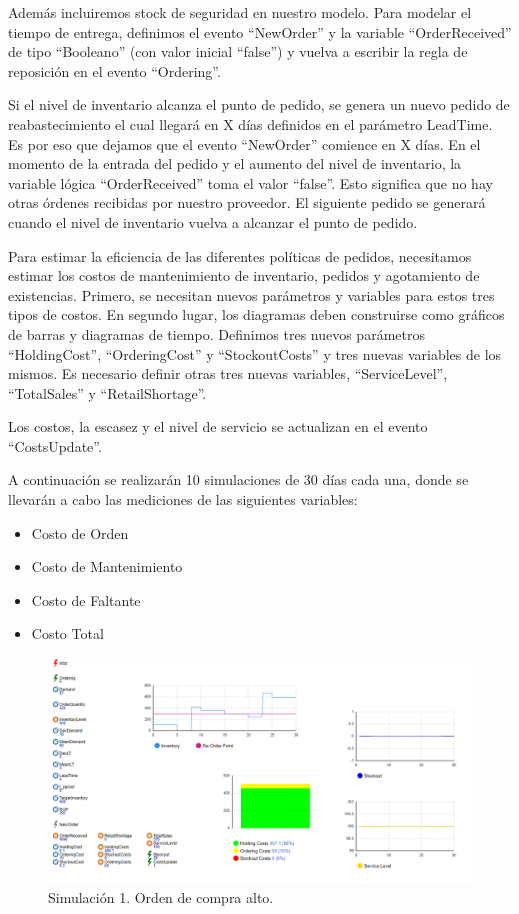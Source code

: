Además incluiremos stock de seguridad en nuestro modelo.
Para modelar el tiempo de entrega, definimos el evento ``NewOrder'' y la variable ``OrderReceived'' de tipo ``Booleano'' (con valor inicial ``false'') y vuelva a escribir la regla de reposición en el evento ``Ordering''.

Si el nivel de inventario alcanza el punto de pedido, se genera un nuevo pedido de reabastecimiento el cual llegará en X días definidos en el parámetro LeadTime.
Es por eso que dejamos que el evento ``NewOrder'' comience en X días.
En el momento de la entrada del pedido y el aumento del nivel de inventario, la variable lógica ``OrderReceived'' toma el valor ``false''. Esto significa que no hay otras órdenes
recibidas por nuestro proveedor.
El siguiente pedido se generará cuando el nivel de inventario vuelva a alcanzar el punto de pedido.

Para estimar la eficiencia de las diferentes políticas de pedidos, necesitamos estimar los costos de mantenimiento de inventario, pedidos y agotamiento de existencias.
Primero, se necesitan nuevos parámetros y variables para estos tres tipos de costos. En segundo lugar, los diagramas deben construirse como gráficos de barras y diagramas de tiempo.
Definimos tres nuevos parámetros ``HoldingCost'', ``OrderingCost'' y ``StockoutCosts'' y tres nuevas variables de los mismos. Es necesario definir otras tres nuevas variables, ``ServiceLevel'', ``TotalSales'' y ``RetailShortage''.

Los costos, la escasez y el nivel de servicio se actualizan en el evento ``CostsUpdate''.

A continuación se realizarán 10 simulaciones de 30 días cada una, donde se llevarán a cabo las mediciones de las siguientes variables:
\begin{itemize}
    \item Costo de Orden
    \item Costo de Mantenimiento
    \item Costo de Faltante
    \item Costo Total
\end{itemize}

\begin{figure}[H]
    \includegraphics[width=\linewidth]{images/img1invent}
    \caption{Simulación 1. Orden de compra alto.}
\end{figure}

